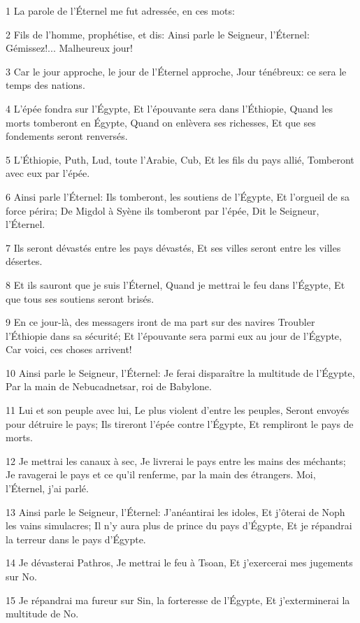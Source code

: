 \par 1 La parole de l'Éternel me fut adressée, en ces mots:
\par 2 Fils de l'homme, prophétise, et dis: Ainsi parle le Seigneur, l'Éternel: Gémissez!... Malheureux jour!
\par 3 Car le jour approche, le jour de l'Éternel approche, Jour ténébreux: ce sera le temps des nations.
\par 4 L'épée fondra sur l'Égypte, Et l'épouvante sera dans l'Éthiopie, Quand les morts tomberont en Égypte, Quand on enlèvera ses richesses, Et que ses fondements seront renversés.
\par 5 L'Éthiopie, Puth, Lud, toute l'Arabie, Cub, Et les fils du pays allié, Tomberont avec eux par l'épée.
\par 6 Ainsi parle l'Éternel: Ils tomberont, les soutiens de l'Égypte, Et l'orgueil de sa force périra; De Migdol à Syène ils tomberont par l'épée, Dit le Seigneur, l'Éternel.
\par 7 Ils seront dévastés entre les pays dévastés, Et ses villes seront entre les villes désertes.
\par 8 Et ils sauront que je suis l'Éternel, Quand je mettrai le feu dans l'Égypte, Et que tous ses soutiens seront brisés.
\par 9 En ce jour-là, des messagers iront de ma part sur des navires Troubler l'Éthiopie dans sa sécurité; Et l'épouvante sera parmi eux au jour de l'Égypte, Car voici, ces choses arrivent!
\par 10 Ainsi parle le Seigneur, l'Éternel: Je ferai disparaître la multitude de l'Égypte, Par la main de Nebucadnetsar, roi de Babylone.
\par 11 Lui et son peuple avec lui, Le plus violent d'entre les peuples, Seront envoyés pour détruire le pays; Ils tireront l'épée contre l'Égypte, Et rempliront le pays de morts.
\par 12 Je mettrai les canaux à sec, Je livrerai le pays entre les mains des méchants; Je ravagerai le pays et ce qu'il renferme, par la main des étrangers. Moi, l'Éternel, j'ai parlé.
\par 13 Ainsi parle le Seigneur, l'Éternel: J'anéantirai les idoles, Et j'ôterai de Noph les vains simulacres; Il n'y aura plus de prince du pays d'Égypte, Et je répandrai la terreur dans le pays d'Égypte.
\par 14 Je dévasterai Pathros, Je mettrai le feu à Tsoan, Et j'exercerai mes jugements sur No.
\par 15 Je répandrai ma fureur sur Sin, la forteresse de l'Égypte, Et j'exterminerai la multitude de No.

